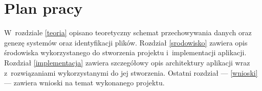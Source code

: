 \section{Plan pracy}
\label{plan-pracy}
W~rozdziale \ref{teoria} opisano teoretyczny schemat przechowywania danych oraz genezę systemów oraz identyfikacji plików. Rozdział \ref{srodowisko} zawiera opis środowiska wykorzystanego do stworzenia projektu i~implementacji aplikacji.
Rozdział \ref{implementacja} zawiera szczegółowy opis architektury aplikacji wraz z~rozwiązaniami wykorzystanymi do jej stworzenia.
Ostatni rozdział --- \ref{wnioski} --- zawiera wnioski na temat wykonanego projektu.

\clearpage
